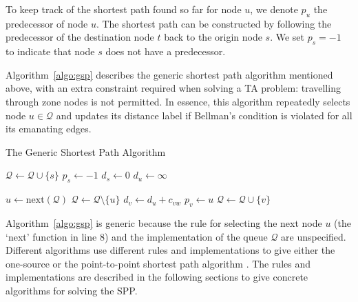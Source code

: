 To keep track of the shortest path found so far for node $u$,
we denote $p_u$ the predecessor of node $u$.
The shortest path can be constructed by following the predecessor of the destination node $t$ back to the origin node $s$.
We set $p_s = -1$ to indicate that node $s$ does not have a predecessor.

Algorithm~\ref{algo:gsp} \citep{Klunder} describes the generic shortest path algorithm mentioned above,
with an extra constraint required when solving a TA problem: travelling through zone nodes is not permitted.
In essence, this algorithm repeatedly selects node $u\in\mathcal{Q}$ and 
updates its distance label if Bellman's condition is violated for all its emanating edges.

\begin{algorithm}
    \caption{The Generic Shortest Path Algorithm}
    \label{algo:gsp}
    \begin{algorithmic}[1]
        \State $\mathcal{Q} \gets \mathcal{Q} \cup \{s\}$ 
        \State $p_s \gets -1$ 
        \State $d_s \gets 0$
         
        \State $d_u \gets \infty$
    \EndFor

    \State $ u \gets \text{next}(\mathcal{Q}) $ 
    \State $ \mathcal{Q} \gets \mathcal{Q} \setminus \{u\} $
     
    \State $d_v \gets d_u + c_{vw}$
    \State $p_v \gets u$
    \State $\mathcal{Q} \gets \mathcal{Q} \cup \{v\}$ 
\EndIf
                    \EndIf
                \EndFor
            \EndIf
        \EndWhile
    \EndProcedure
\end{algorithmic}
\end{algorithm}

Algorithm~\ref{algo:gsp} is generic because 
the rule for selecting the next node $u$ (the `next' function in line 8) and
the implementation of the queue $\mathcal{Q}$ are unspecified.
Different algorithms use different rules and implementations to give 
either the one-source or the point-to-point shortest path algorithm \citep{mplomer}.
The rules and implementations are described in the following sections to give concrete algorithms for solving the SPP.

